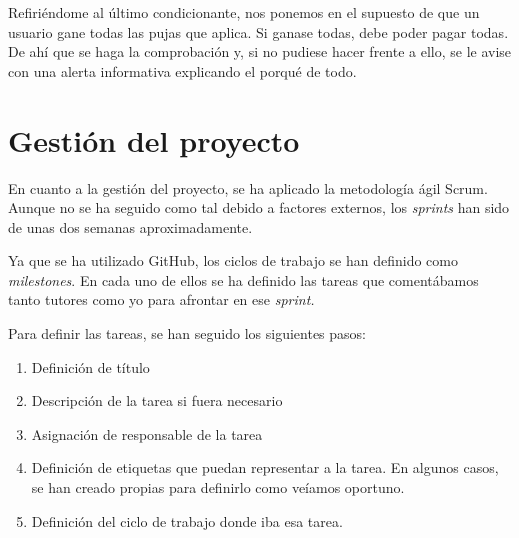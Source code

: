 	Refiriéndome al último condicionante, nos ponemos en el supuesto de que un usuario gane todas las pujas que aplica. Si ganase todas, debe poder pagar todas. De ahí que se haga la comprobación y, si no pudiese hacer frente a ello, se le avise con una alerta informativa explicando el porqué de todo.
	
\section{Gestión del proyecto}
	
	En cuanto a la gestión del proyecto, se ha aplicado la metodología ágil Scrum. Aunque no se ha seguido como tal debido a factores externos, los \emph{sprints} han sido de unas dos semanas aproximadamente.
	
	Ya que se ha utilizado GitHub, los ciclos de trabajo se han definido como \emph{milestones}. En cada uno de ellos se ha definido las tareas que comentábamos tanto tutores como yo para afrontar en ese \emph{sprint.}
	
	Para definir las tareas, se han seguido los siguientes pasos:
	\begin{enumerate}
		\item Definición de título
		\item Descripción de la tarea si fuera necesario
		\item Asignación de responsable de la tarea
		\item Definición de etiquetas que puedan representar a la tarea. En algunos casos, se han creado propias para definirlo como veíamos oportuno.
		\item Definición del ciclo de trabajo donde iba esa tarea.
	\end{enumerate}
